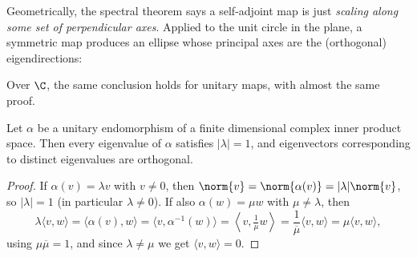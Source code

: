 Geometrically, the spectral theorem says a self-adjoint map is just \emph{scaling along some set of perpendicular axes}. Applied to the unit circle in the plane, a symmetric map produces an ellipse whose principal axes are the (orthogonal) eigendirections:
\begin{center}
\end{center}

Over $\C$, the same conclusion holds for unitary maps, with almost the same proof.

\begin{lemma}
    Let $\alpha$ be a unitary endomorphism of a finite dimensional complex inner product space. Then every eigenvalue of $\alpha$ satisfies $|\lambda| = 1$, and eigenvectors corresponding to distinct eigenvalues are orthogonal.
\end{lemma}
\begin{proof}
    If $\alpha(v) = \lambda v$ with $v \neq 0$, then $\norm{v} = \norm{\alpha(v)} = |\lambda|\norm{v}$, so $|\lambda| = 1$ (in particular $\lambda \neq 0$). If also $\alpha(w) = \mu w$ with $\mu \neq \lambda$, then
    $$
    \lambda\langle v, w \rangle = \langle \alpha(v), w \rangle = \langle v, \alpha^{-1}(w)\rangle = \left\langle v, \tfrac{1}{\mu}w\right\rangle = \frac{1}{\overline{\mu}}\langle v, w\rangle = \mu \langle v, w \rangle,
    $$
    using $\mu\overline{\mu} = 1$, and since $\lambda \neq \mu$ we get $\langle v, w \rangle = 0$.
\end{proof}

